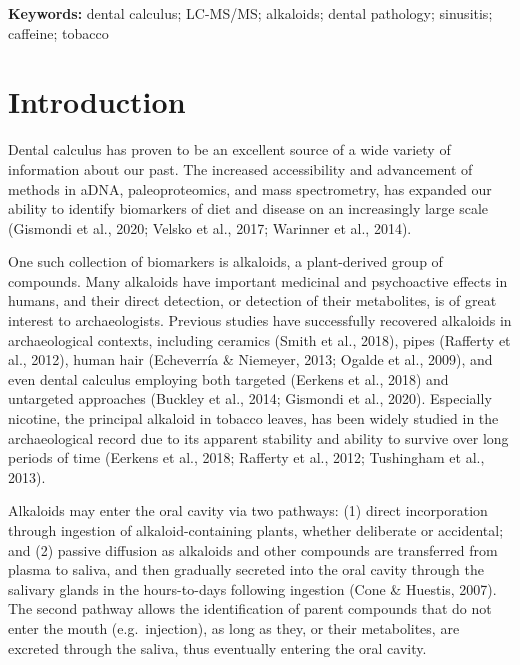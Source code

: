 \documentclass[
]{article}
\begin{document}
\small \textbf{Keywords:}  dental calculus; LC-MS/MS; alkaloids; dental
pathology; sinusitis; caffeine; tobacco   \\

\vfill

\ifdefined\Shaded\renewenvironment{Shaded}{\begin{tcolorbox}[enhanced, sharp corners, breakable, boxrule=0pt, borderline west={3pt}{0pt}{shadecolor}, interior hidden, frame hidden]}{\end{tcolorbox}}\fi

\hypertarget{introduction}{%
\section{Introduction}\label{introduction}}

Dental calculus has proven to be an excellent source of a wide variety
of information about our past. The increased accessibility and
advancement of methods in aDNA, paleoproteomics, and mass spectrometry,
has expanded our ability to identify biomarkers of diet and disease on
an increasingly large scale (Gismondi et al., 2020; Velsko et al., 2017;
Warinner et al., 2014).

One such collection of biomarkers is alkaloids, a plant-derived group of
compounds. Many alkaloids have important medicinal and psychoactive
effects in humans, and their direct detection, or detection of their
metabolites, is of great interest to archaeologists. Previous studies
have successfully recovered alkaloids in archaeological contexts,
including ceramics (Smith et al., 2018), pipes (Rafferty et al., 2012),
human hair (Echeverría \& Niemeyer, 2013; Ogalde et al., 2009), and even
dental calculus employing both targeted (Eerkens et al., 2018) and
untargeted approaches (Buckley et al., 2014; Gismondi et al., 2020).
Especially nicotine, the principal alkaloid in tobacco leaves, has been
widely studied in the archaeological record due to its apparent
stability and ability to survive over long periods of time (Eerkens et
al., 2018; Rafferty et al., 2012; Tushingham et al., 2013).

Alkaloids may enter the oral cavity via two pathways: (1) direct
incorporation through ingestion of alkaloid-containing plants, whether
deliberate or accidental; and (2) passive diffusion as alkaloids and
other compounds are transferred from plasma to saliva, and then
gradually secreted into the oral cavity through the salivary glands in
the hours-to-days following ingestion (Cone \& Huestis, 2007). The
second pathway allows the identification of parent compounds that do not
enter the mouth (e.g.~injection), as long as they, or their metabolites,
are excreted through the saliva, thus eventually entering the oral
cavity.
\end{document}
